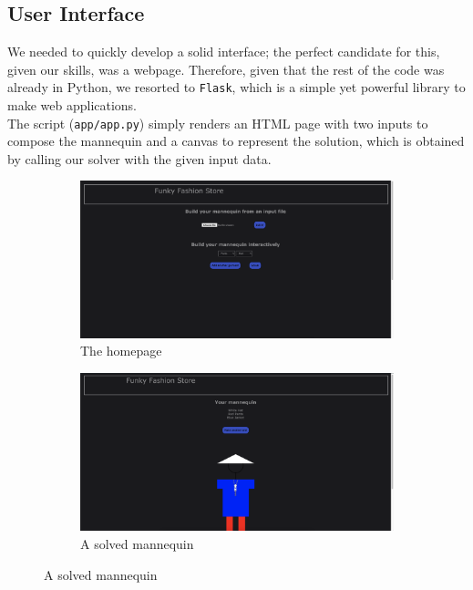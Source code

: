 \documentclass[12pt]{article}
\begin{document}
    \subsection{User Interface}
        We needed to quickly develop a solid interface; the perfect candidate for this, given our skills, was a webpage. Therefore, given that the rest of the code
        was already in Python, we resorted to \texttt{Flask}, which is a simple yet powerful library to make web applications.\\
        The script (\texttt{app/app.py}) simply renders an HTML page with two inputs to compose the mannequin and a canvas to represent the solution, which is obtained by 
        calling our solver with the given input data.

        \begin{figure}[H]
            \centering
            \begin{subfigure}{0.49\textwidth}
                    \includegraphics[width=\textwidth]{img/interface1.png}
                    \caption{The homepage}
            \end{subfigure}
            \begin{subfigure}{0.49\textwidth}
                    \includegraphics[width=\textwidth]{img/interface2.png}
                    \caption{A solved mannequin}
            \end{subfigure}
        \end{figure}
\end{document}
